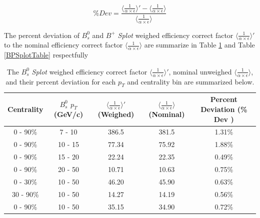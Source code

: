 \begin{equation}
\% Dev = \frac{\langle \frac{1}{\alpha \times \epsilon} \rangle' - \langle \frac{1}{\alpha \times \epsilon} \rangle}{\langle \frac{1}{\alpha \times \epsilon} \rangle}
\end{equation}


The percent deviation of $B^0_s$ and $B^+$ \textit{Splot} weighed efficiency correct factor $\langle \frac{1}{\alpha \times \epsilon}\rangle'$ to the nominal efficiency correct factor $\langle \frac{1}{\alpha \times \epsilon}\rangle$ are summarize in Table \ref{BsSplotTable} and Table \ref{BPSplotTable} respectfully  



\begin{table}[h]
\begin{center}
\caption{The $B^0_s$ \textit{Splot} weighed efficiency correct factor $\langle \frac{1}{\alpha \times \epsilon}\rangle'$, nominal unweighed $\langle \frac{1}{\alpha \times \epsilon} \rangle$, and their percent deviation for each $p_T$ and centrality bin are summarized below.}
\vspace{1em}
\label{BsSplotTable}
  \begin{tabular}{| c | c |c |c | c|}
    \hline
     Centrality & $B^0_s$  $p_T$ (GeV/c) & $\langle \frac{1}{\alpha \times \epsilon} \rangle'$ (Weighed) & $\langle \frac{1}{\alpha \times \epsilon} \rangle$ (Nominal)  & Percent Deviation (\% Dev ) \\
    \hline
    \hline
0 - 90\% & 7 - 10   &  386.5  & 381.5 & 1.31\% \\ 
0 - 90\% & 10 - 15 &   77.34 & 75.92 & 1.88\%  \\ 
0 - 90\% & 15 - 20 &  22.24  &  22.35 & 0.49\% \\ 
0 - 90\% & 20 - 50 &   10.71 & 10.63 & 0.75\%  \\ 
0 - 30\% & 10 - 50 &  46.20  &45.90 & 0.63\%  \\ 
30 - 90\% & 10 - 50 &  14.27 &14.19 & 0.56\% \\ 
0 - 90\% & 10 - 50 &   35.15  & 34.90 &  0.72\% \\ 
    \hline
    \hline
\end{tabular}
\end{center}
\end{table}

